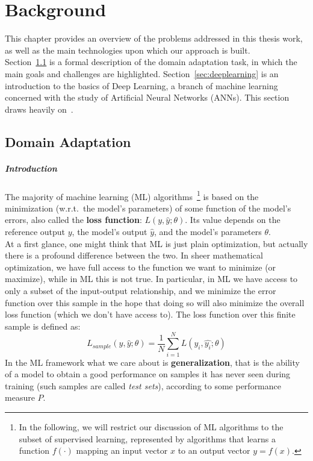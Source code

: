 \documentclass[../main.tex]{subfiles}
\begin{document}
    \chapter{Background}\label{chap:background}

    This chapter provides an overview of the problems addressed in this thesis work, as well as the main
    technologies upon which our approach is built. \\
    Section~\ref{sec:domainadapt} is a formal description of the domain adaptation task, in which
    the main goals and challenges are highlighted.
    Section~\ref{sec:deeplearning} is an introduction to the basics of Deep Learning,
    a branch of machine learning concerned with the study of Artificial Neural Networks (ANNs).
    This section draws heavily on~\cite{Goodfellow-et-al-2016}.

    \section{Domain Adaptation}\label{sec:domainadapt}

    \paragraph{Introduction}
    The majority of machine learning (ML) algorithms~\footnote{In the following, we will restrict our discussion of
    ML algorithms to the subset of supervised learning, represented by algorithms that learns a function $f(\cdot)$
    mapping an input vector $x$ to an output vector $y = f(x)$.} is based on the minimization (w.r.t.\ the model's parameters)
    of some function of the model's errors,
    also called the \textbf{loss function}: $L(y, \hat{y}; \theta)$. Its value depends on the reference output $y$, the model's output
    $\hat{y}$, and the model's parameters $\theta$. \\
    At a first glance, one might think that ML is just plain optimization, but actually there is a profound difference
    between the two. In sheer mathematical optimization, we have full access to the function we want to minimize (or maximize),
    while in ML this is not true. In particular, in ML we have access to only a subset of the input-output relationship,
    and we minimize the error function over this sample in the hope that doing so will also minimize the overall loss function
    (which we don't have access to). The loss function over this finite sample is defined as:
    $$ L_{sample}(y, \hat{y}; \theta) = \frac{1}{N} \sum_{i = 1}^{N} L(y_{i}, \hat{y_{i}}; \theta) $$
    In the ML framework what we care about is \textbf{generalization}, that is the ability of a model to obtain a good
    performance on samples it has never seen during training (such samples are called \textit{test sets}), according to some performance measure $P$.
\end{document}
